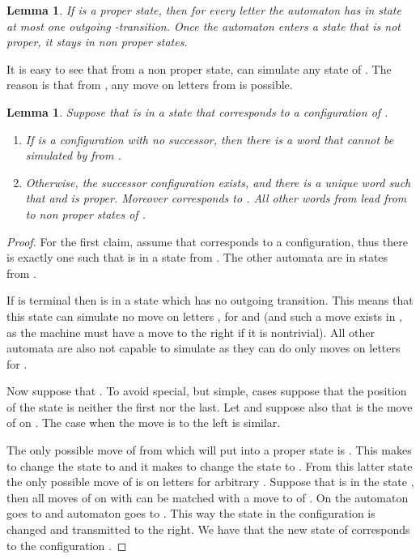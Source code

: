 \documentclass{LMCS}
\theoremstyle{plain}\newtheorem{remark}{Remark}
\theoremstyle{plain}\newtheorem{lemma}[thm]{Lemma}
\begin{document}
\begin{lemma}
  If  is a proper state, then for every letter  the
  automaton  has in state  at most one outgoing
  -transition.  Once the automaton enters a state that is not
  proper, it stays in non proper states.
\end{lemma}
 It is easy to see that from a non proper state,  can simulate 
any state of . The reason is that from ,
 any move on letters from  is possible.


\begin{lemma} \label{l:step}
Suppose that  is in a state  that corresponds to a
  configuration  of .
  \begin{enumerate}[]
  \item If  is a configuration with no successor,
    then there is a word  that cannot be simulated by
     from .

  \item Otherwise, the successor configuration  exists,
    and there is a unique word  such that
     and  is proper. Moreover 
    corresponds to . All other words from  lead from 
    to non
    proper states of . 
  \end{enumerate}
\end{lemma}

\begin{proof}

  For the first claim, assume that  corresponds to a configuration, 
thus there is exactly one 
  such that  is in a state from . The other
  automata are in states from . 
  
  If  is terminal then  is in a state  which has
  no  outgoing transition. This means that this state can
  simulate no  move on letters , for   and  (and
  such a move exists in , as the machine  must have a move to the
  right if it is nontrivial). All other automata are also not capable
  to simulate  as they can do only moves on letters  for
  .

  Now suppose that . To avoid special, but simple, cases
  suppose that the position  of the state is neither the first nor
  the last. Let  and suppose also that  is the
  move of  on . The case when the move is to the left is
  similar.

  The only possible move of  from  which will put 
  into a proper state is . This makes  to change the
  state to  and it makes  to change the state to . From
  this latter state the only possible move of  is on letters
   for arbitrary . Suppose that  is in the
  state , then all moves of  on  with 
  can be matched with a move to  of . On 
 the automaton  goes to  and automaton  goes to
  . This way the state in the configuration is changed and
  transmitted to the right. We have that the new state of 
  corresponds to the configuration . 


\end{proof}
\end{document}
